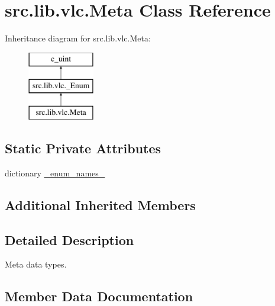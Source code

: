 \hypertarget{classsrc_1_1lib_1_1vlc_1_1Meta}{}\section{src.\+lib.\+vlc.\+Meta Class Reference}
\label{classsrc_1_1lib_1_1vlc_1_1Meta}
Inheritance diagram for src.\+lib.\+vlc.\+Meta\+:\begin{figure}[H]
\begin{center}
\leavevmode
\includegraphics[height=3.000000cm]{classsrc_1_1lib_1_1vlc_1_1Meta}
\end{center}
\end{figure}
\subsection*{Static Private Attributes}
\begin{DoxyCompactItemize}
\item 
dictionary \hyperlink{classsrc_1_1lib_1_1vlc_1_1Meta_a9f7d14459cdacb3bd5c93b7f0c289a9b}{\+\_\+enum\+\_\+names\+\_\+}
\end{DoxyCompactItemize}
\subsection*{Additional Inherited Members}


\subsection{Detailed Description}
\begin{DoxyVerb}Meta data types.
\end{DoxyVerb}
 

\subsection{Member Data Documentation}
\hypertarget{classsrc_1_1lib_1_1vlc_1_1Meta_a9f7d14459cdacb3bd5c93b7f0c289a9b}{}
